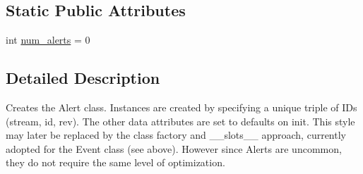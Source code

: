 \subsection*{Static Public Attributes}
\begin{DoxyCompactItemize}
\item 
int \hyperlink{classamonpy_1_1dbase_1_1db__classes_1_1_alert_a57cb88bfad7b53e94ede6ac06de3ab46}{num\-\_\-alerts} = 0
\end{DoxyCompactItemize}


\subsection{Detailed Description}
\begin{DoxyVerb}Creates the Alert class. Instances are created by specifying a unique 
    triple of IDs (stream, id, rev). The other data attributes are set to
    defaults on init. This style may later be replaced by the class
    factory and __slots__ approach, currently adopted for the Event
    class (see above). However since Alerts are uncommon, they do not
    require the same level of optimization. 
\end{DoxyVerb}
 

